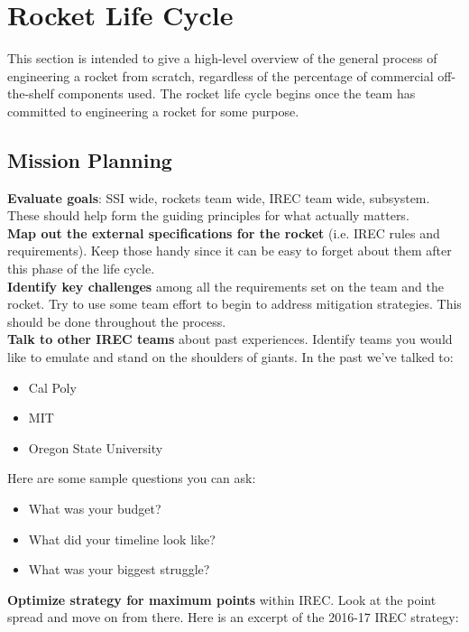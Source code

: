 \chapter{Rocket Life Cycle}
\label{sec:rocketlifecycle}

This section is intended to give a high-level overview of the general process of engineering a rocket from scratch, regardless of the percentage of commercial off-the-shelf components used. The rocket life cycle begins once the team has committed to engineering a rocket for some purpose.

\section{Mission Planning}
\textbf{Evaluate goals}: SSI wide, rockets team wide, IREC team wide, subsystem. These should help form the guiding principles for what actually matters.\\

\textbf{Map out the external specifications for the rocket} (i.e. IREC rules and requirements). Keep those handy since it can be easy to forget about them after this phase of the life cycle. \\

\textbf{Identify key challenges} among all the requirements set on the team and the rocket. Try to use some team effort to begin to address mitigation strategies. This should be done throughout the process. \\

\textbf{Talk to other IREC teams} about past experiences. Identify teams you would like to emulate and stand on the shoulders of giants. In the past we've talked to: 
\begin{itemize}
\item Cal Poly
\item MIT
\item Oregon State University 
\end{itemize}
Here are some sample questions you can ask:
\begin{itemize}
\item What was your budget?
\item What did your timeline look like?
\item What was your biggest struggle?
\end{itemize}

\textbf{Optimize strategy for maximum points} within IREC. Look at the point spread and move on from there. Here is an excerpt of the 2016-17 IREC strategy:\\


